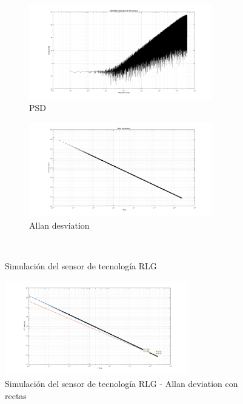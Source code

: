 \documentclass[a4paper,11pt,twoside]{IT-CNEA}
\begin{document}
\begin{figure}[t!]
    \centering
    \begin{subfigure}[t]{0.5\textwidth}
        \centering
        \includegraphics[width=8cm]{Figuras/PSDRLG.png}
        \caption{PSD}
        \label{fig:}
    \end{subfigure}%
    \begin{subfigure}[t]{0.5\textwidth}
        \centering
        \includegraphics[width=8cm]{Figuras/AllanRLG.png}
        \caption{Allan desviation}
        \label{fig:}
    \end{subfigure}%
    ~ 
    \caption{Simulación del sensor de tecnología RLG}
    \label{fig:simulacionRLG}
\end{figure}
\begin{figure}[h!]
\centering
\includegraphics[width=8cm]{Figuras/AllanRLGRectas.png}
\caption{Simulación del sensor de tecnología RLG - Allan deviation con rectas}
\label{fig:simulacionRLGRectas}
\end{figure}
\clearpage
\newpage
\end{document}
